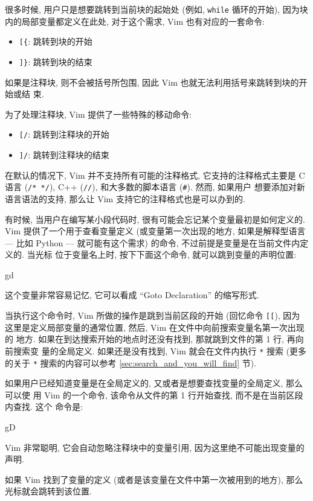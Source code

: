 很多时候, 用户只是想要跳转到当前块的起始处 (例如, \texttt{while} 循环的开始),
因为块内的局部变量都定义在此处, 对于这个需求, Vim 也有对应的一套命令:
\begin{itemize}
    \item \verb'[{': 跳转到块的开始
    \item \verb']}': 跳转到块的结束
\end{itemize}

如果是注释块, 则不会被括号所包围, 因此 Vim 也就无法利用括号来跳转到块的开始或结
束.

为了处理注释块, Vim 提供了一些特殊的移动命令:
\begin{itemize}
    \item \verb'[/': 跳转到注释块的开始
    \item \verb']/': 跳转到注释块的结束
\end{itemize}

在默认的情况下, Vim 并不支持所有可能的注释格式, 它支持的注释格式主要是 C 语言
(\verb'/* */'), C++ (\verb'//'), 和大多数的脚本语言 (\verb'#'). 然而, 如果用户
想要添加对新语言语法的支持, 那么让 Vim 支持它的注释格式也是可以办到的.

有时候, 当用户在编写某小段代码时, 很有可能会忘记某个变量最初是如何定义的. Vim
提供了一个用于查看变量定义 (或变量第一次出现的地方, 如果是解释型语言 --- 比如
Python --- 就可能有这个需求) 的命令, 不过前提是变量是在当前文件内定义的. 当光标
位于变量名上时, 按下下面这个命令, 就可以跳到变量的声明位置:
\begin{vimcode}
gd
\end{vimcode}
这个变量非常容易记忆, 它可以看成 ``Goto Declaration'' 的缩写形式.

当执行这个命令时, Vim 所做的操作是跳到当前区段的开始 (回忆命令 \verb'[['), 因为
这里是定义局部变量的通常位置, 然后, Vim 在文件中向前搜索变量名第一次出现的
地方. 如果在到达搜索开始的地点时还没有找到, 那就跳到文件的第 1 行, 再向前搜索变
量的全局定义. 如果还是没有找到, Vim 就会在文件内执行 \verb'*' 搜索 (更多的关于
\verb'*' 搜索的内容可以参考 \ref{sec:search_and_you_will_find} 节).

如果用户已经知道变量是在全局定义的, 又或者是想要查找变量的全局定义, 那么可以使
用 Vim 的一个命令, 该命令从文件的第 1 行开始查找, 而不是在当前区段内查找. 这个
命令是:
\begin{vimcode}
gD
\end{vimcode}
Vim 非常聪明, 它会自动忽略注释块中的变量引用, 因为这里绝不可能出现变量的声明.

如果 Vim 找到了变量的定义 (或者是该变量在文件中第一次被用到的地方),
那么光标就会跳转到该位置.

